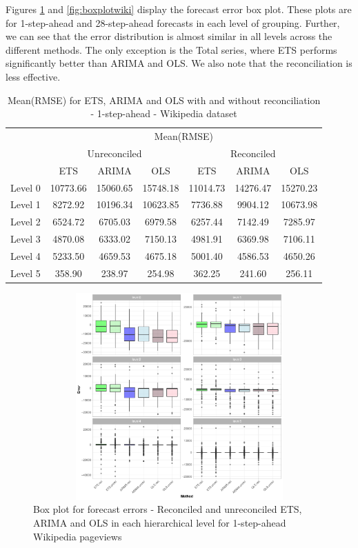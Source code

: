 \documentclass[11pt,a4paper,]{article}
\begin{document}
Figures \ref{fig:boxplotrollingwiki} and \ref{fig:boxplotwiki} display the forecast error box plot. These plots are for 1-step-ahead and 28-step-ahead forecasts in each level of grouping. Further, we can see that the error distribution is almost similar in all levels across the different methods. The only exception is the Total series, where ETS performs significantly better than ARIMA and OLS. We also note that the reconciliation is less effective.

\begin{table}[t]

\caption{\label{tab:wikipediadataresulrolling}Mean(RMSE) for ETS, ARIMA and OLS with and without reconciliation - 1-step-ahead - Wikipedia dataset}
\centering
\begin{tabular}{ccccccc}
\toprule
\multicolumn{1}{c}{} & \multicolumn{6}{c}{Mean(RMSE)} \\
\cmidrule(l{3pt}r{3pt}){2-7}
\multicolumn{1}{c}{} & \multicolumn{3}{c}{Unreconciled} & \multicolumn{3}{c}{Reconciled} \\
\cmidrule(l{3pt}r{3pt}){2-4} \cmidrule(l{3pt}r{3pt}){5-7}
 & ETS & ARIMA & OLS & ETS & ARIMA & OLS\\
\midrule
Level 0 & 10773.66 & 15060.65 & 15748.18 & 11014.73 & 14276.47 & 15270.23\\
Level 1 & 8272.92 & 10196.34 & 10623.85 & 7736.88 & 9904.12 & 10673.98\\
Level 2 & 6524.72 & 6705.03 & 6979.58 & 6257.44 & 7142.49 & 7285.97\\
Level 3 & 4870.08 & 6333.02 & 7150.13 & 4981.91 & 6369.98 & 7106.11\\
Level 4 & 5233.50 & 4659.53 & 4675.18 & 5001.40 & 4586.53 & 4650.26\\
Level 5 & 358.90 & 238.97 & 254.98 & 362.25 & 241.60 & 256.11\\
\bottomrule
\end{tabular}
\end{table}

\begin{figure}

{\centering \includegraphics[width=450px,height=300px]{Paper-Figures/results_Wikipedia/boxplot_1} 

}

\caption{Box plot for forecast errors -  Reconciled and unreconciled ETS, ARIMA and OLS in each hierarchical level for 1-step-ahead Wikipedia pageviews}\label{fig:boxplotrollingwiki}
\end{figure}
\end{document}
